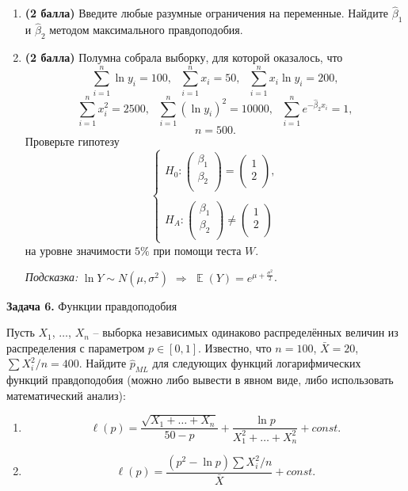 \documentclass[10pt, a4paper]{extarticle}
\DeclareMathOperator{\E}{\mathbb{E}}
\begin{document}
	\begin{enumerate}
		\item \textbf{(2 балла)} Введите любые разумные ограничения на переменные. Найдите $\hat{\beta}_1$ и $\hat{\beta}_2$ методом максимального правдоподобия.
		\item  \textbf{(2 балла)} Полумна собрала выборку, для которой оказалось, что 
		\[
		\sum_{i=1}^n \ln y_i = 100, \text{ } \sum_{i = 1}^n x_i = 50,\text{ } \sum_{i = 1}^n x_i\ln y_i = 200,
		\]
		\[
		\sum_{i = 1}^n x^2_i = 2500, \text{ } \sum_{i = 1}^n (\ln y_i)^2 = 10000, \text{ } \sum_{i=1}^ne^{-\hat{\beta}_2x_i} = 1,
		\]
		\[
		n = 500.
		\]
		Проверьте гипотезу
		\[
		\begin{cases}
		H_0: \begin{pmatrix}
			\beta_1 \\
			\beta_2 \\
		\end{pmatrix} = 
		\begin{pmatrix}
			1 \\
			2 \\
		\end{pmatrix}, \\\\
		 H_A: \begin{pmatrix}
			\beta_1 \\
			\beta_2 \\
		\end{pmatrix} \ne
		\begin{pmatrix}
			1 \\
			2 \\
		\end{pmatrix}
		\end{cases}
		\]
		на уровне значимости $5\%$ при помощи теста $W$.
		
		\textit{Подсказка:} $\ln Y \sim N(\mu, \sigma^2)$ $\Rightarrow$ $\E(Y) = e^{\mu + \frac{\sigma^2}{2}}$.
	\end{enumerate}

	{\Large \textbf{Задача 6.} Функции правдоподобия}
	
	Пусть $X_1$, $\ldots$, $X_n$ – выборка независимых одинаково распределённых величин из распределения с параметром $p \in [0, 1]$. 
	Известно, что $n = 100$, $\bar{X} = 20$, $\sum{X_i^2}/n = 400$. Найдите $\hat{p}_{ML}$ для следующих функций логарифмических функций правдоподобия (можно либо вывести в явном виде, либо использовать математический анализ):
	\begin{enumerate}
		\item 
		\[
		\ell(p) = \dfrac{\sqrt{X_1 + \ldots + X_n}}{50 - p} + \dfrac{\ln p}{X_1^2 + \ldots + X_n^2} + const.
		\]
		\item \[
		\ell(p) = \dfrac{(p^2 - \ln p)\sum{X_i^2}/n}{\bar{X}} + const.
		\]
	\end{enumerate}
\end{document}
